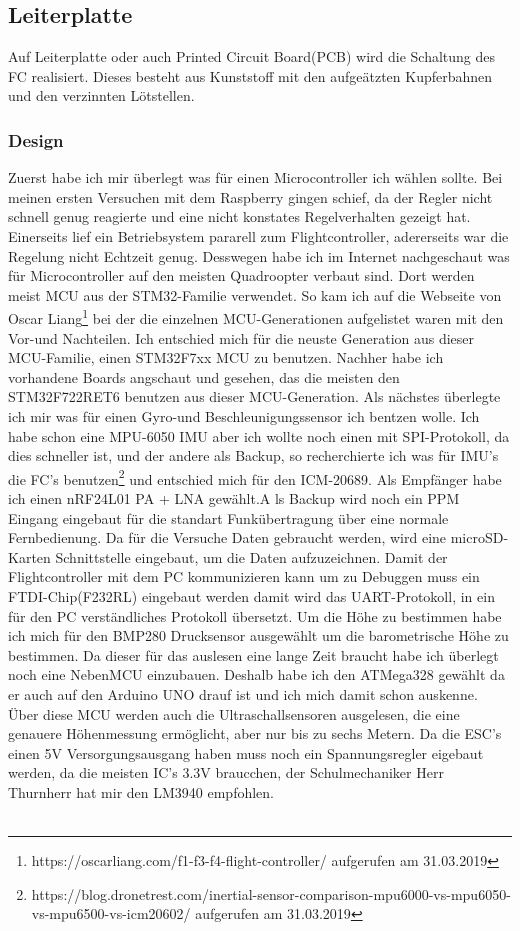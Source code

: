 \documentclass[12pt,a4paper, ngerman]{article}
\begin{document}
\subsection{Leiterplatte}
Auf Leiterplatte oder auch Printed Circuit Board(PCB) wird die Schaltung des FC realisiert. Dieses besteht aus Kunststoff mit den aufgeätzten Kupferbahnen und den verzinnten Lötstellen.
\subsubsection{Design}
Zuerst habe ich mir überlegt was für einen Microcontroller ich wählen sollte. Bei meinen ersten Versuchen mit dem Raspberry gingen schief, da der Regler nicht schnell genug reagierte und eine nicht konstates Regelverhalten gezeigt hat. Einerseits lief ein Betriebsystem pararell zum Flightcontroller, adererseits war die Regelung nicht Echtzeit genug. Desswegen habe ich im Internet nachgeschaut was für Microcontroller auf den meisten Quadroopter verbaut sind. Dort werden  meist MCU aus der STM32-Familie verwendet. So kam ich auf die Webseite von Oscar Liang\footnote{\label{foot:1}https://oscarliang.com/f1-f3-f4-flight-controller/ aufgerufen am 31.03.2019} bei der die einzelnen MCU-Generationen aufgelistet waren mit den Vor-und Nachteilen. Ich entschied mich für die neuste Generation aus dieser MCU-Familie, einen STM32F7xx MCU zu benutzen. Nachher habe ich vorhandene Boards angschaut und gesehen, das die meisten den STM32F722RET6 benutzen aus dieser MCU-Generation. Als nächstes überlegte ich mir was für einen Gyro-und Beschleunigungssensor ich bentzen wolle. Ich habe schon eine MPU-6050 IMU aber ich wollte noch einen mit SPI-Protokoll, da dies schneller ist, und der andere als Backup, so recherchierte ich was für IMU's die FC's benutzen\footnote{\label{foot:2}https://blog.dronetrest.com/inertial-sensor-comparison-mpu6000-vs-mpu6050-vs-mpu6500-vs-icm20602/ aufgerufen am 31.03.2019} und entschied mich für den ICM-20689. Als Empfänger habe ich einen nRF24L01 PA + LNA gewählt.A ls Backup wird noch ein PPM Eingang eingebaut für die standart Funkübertragung über eine normale Fernbedienung. Da für die Versuche Daten gebraucht werden, wird eine microSD-Karten Schnittstelle eingebaut, um die Daten aufzuzeichnen. Damit der Flightcontroller mit dem PC kommunizieren kann um zu Debuggen muss ein FTDI-Chip(F232RL) eingebaut werden damit wird das UART-Protokoll, in ein für den PC verständliches Protokoll übersetzt. Um die Höhe zu bestimmen habe ich mich für den BMP280 Drucksensor ausgewählt um die barometrische Höhe zu bestimmen. Da dieser für das auslesen eine lange Zeit braucht habe ich überlegt noch eine NebenMCU einzubauen. Deshalb habe ich den ATMega328 gewählt da er auch auf den Arduino UNO drauf ist und ich mich damit schon auskenne. Über diese MCU werden auch die Ultraschallsensoren ausgelesen, die eine genauere Höhenmessung ermöglicht, aber nur bis zu sechs Metern. Da die ESC's einen 5V Versorgungsausgang haben muss noch ein Spannungsregler  eigebaut werden, da die meisten IC's 3.3V braucchen, der Schulmechaniker Herr Thurnherr hat mir den LM3940 empfohlen.\\ \\
\end{document}

